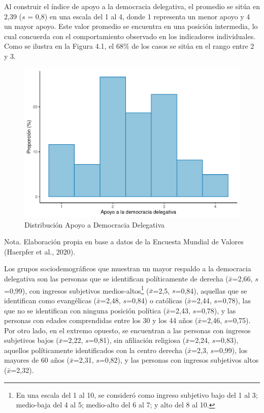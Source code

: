 \documentclass[12pt,twoside]{templates/facsothesis}
\begin{document}
\FloatBarrier

Al construir el índice de apoyo a la democracia delegativa, el promedio se sitúa en 2,39 (\(s\) = 0,8) en una escala del 1 al 4, donde 1 representa un menor apoyo y 4 un mayor apoyo. Este valor promedio se encuentra en una posición intermedia, lo cual concuerda con el comportamiento observado en los indicadores individuales. Como se ilustra en la Figura 4.1, el 68\% de los casos se sitúa en el rango entre 2 y 3.

\begin{figure}[!ht]

{\centering \includegraphics[width=1\linewidth,]{tesis_files/figure-latex/unnamed-chunk-7-1} 

}

\caption{Distribución Apoyo a Democracia Delegativa}\label{fig:unnamed-chunk-7}
\end{figure}
\FloatBarrier

Nota. Elaboración propia en base a datos de la Encuesta Mundial de Valores (Haerpfer et al., 2020).

Los grupos sociodemográficos que muestran un mayor respaldo a la democracia delegativa son las personas que se identifican políticamente de derecha (\(\bar{x}\)=2,66, \(s\)=0,99), con ingresos subjetivos medios-altos\footnote{En una escala del 1 al 10, se consideró como ingreso subjetivo bajo del 1 al 3; medio-baja del 4 al 5; medio-alto del 6 al 7; y alto del 8 al 10.} (\(\bar{x}\)=2,5, \(s\)=0,84), aquellas que se identifican como evangélicas (\(\bar{x}\)=2,48, \(s\)=0,84) o católicas (\(\bar{x}\)=2,44, \(s\)=0,78), las que no se identifican con ninguna posición política (\(\bar{x}\)=2,43, \(s\)=0,78), y las personas con edades comprendidas entre los 30 y los 44 años (\(\bar{x}\)=2,46, \(s\)=0,75). Por otro lado, en el extremo opuesto, se encuentran a las personas con ingresos subjetivos bajos (\(\bar{x}\)=2,22, \(s\)=0,81), sin afiliación religiosa (\(\bar{x}\)=2,24, \(s\)=0,83), aquellos políticamente identificados con la centro derecha (\(\bar{x}\)=2,3, \(s\)=0,99), los mayores de 60 años (\(\bar{x}\)=2,31, \(s\)=0,82), y las personas con ingresos subjetivos altos (\(\bar{x}\)=2,32).
\end{document}
